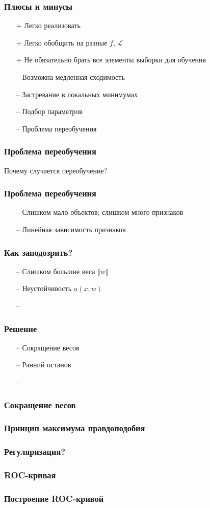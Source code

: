 \documentclass[12pt]{beamer}
\begin{document}
\begin{frame}\frametitle{Плюсы и минусы}
\begin{itemize}
\item[+] Легко реализовать
\item[+] Легко обобщить на разные $f$, $\mathcal{L}$
\item[+] Не обязательно брать все элементы выборки для обучения
\end{itemize}
\begin{itemize}
\item[--] Возможна медленная сходимость
\item[--] Застревание в локальных минимумах
\item[--] Подбор параметров
\item[--] Проблема переобучения
\end{itemize}
\end{frame}

\begin{frame}\frametitle{Проблема переобучения}
Почему случается переобучение?
\end{frame}

\begin{frame}\frametitle{Проблема переобучения}
\begin{itemize}
\item[--] Слишком мало объектов; слишком много признаков
\item[--] Линейная зависимость признаков
\end{itemize}
\end{frame}

\begin{frame}\frametitle{Как заподозрить?}
\begin{itemize}
\item[--] Слишком большие веса $\Vert w \Vert$
\item[--] Неустойчивость $a(x,w)$
\item[--] 
\end{itemize}
\end{frame}

\begin{frame}\frametitle{Решение}
\begin{itemize}
\item[--] Сокращение весов
\item[--] Ранний останов
\item[--] 
\end{itemize}
\end{frame}

\begin{frame}\frametitle{Сокращение весов}

\end{frame}

\begin{frame}\frametitle{Принцип максимума правдоподобия}

\end{frame}

\begin{frame}\frametitle{Регуляризация?}

\end{frame}

\begin{frame}\frametitle{ROC-кривая}

\end{frame}

\begin{frame}\frametitle{Построение ROC-кривой}

\end{frame}
\end{document}
